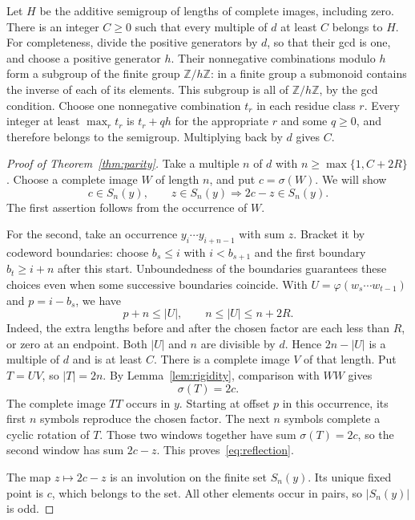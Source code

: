 \documentclass[11pt]{article}
\newcommand{\Z}{\mathbb Z}
\newcommand{\sumword}[1]{\sigma(#1)}
\begin{document}
Let $H$ be the additive semigroup of lengths of complete images, including
zero. There is an integer $C\geq0$ such that every multiple of $d$ at
least $C$ belongs to $H$. For completeness, divide the positive
generators by $d$, so that their gcd is one, and choose a positive
generator $h$. Their nonnegative combinations modulo $h$ form a subgroup
of the finite group $\Z/h\Z$: in a finite group a submonoid contains
the inverse of each of its elements. This subgroup is all of
$\Z/h\Z$, by the gcd condition. Choose one nonnegative combination
$t_r$ in each residue class $r$. Every integer at least $\max_r t_r$
is $t_r+qh$ for the appropriate $r$ and some $q\geq0$, and therefore
belongs to the semigroup. Multiplying back by $d$ gives $C$.

\begin{proof}[Proof of Theorem~\ref{thm:parity}]
Take a multiple $n$ of $d$ with $n\geq\max\{1,C+2R\}$.
Choose a complete image $W$ of length $n$, and put $c=\sumword{W}$.
We will show
\begin{equation}\label{eq:reflection}
 c\in S_n(y),\qquad z\in S_n(y)\Longrightarrow 2c-z\in S_n(y).
\end{equation}
The first assertion follows from the occurrence of $W$.

For the second, take an occurrence $y_i\cdots y_{i+n-1}$ with sum $z$.
Bracket it by codeword boundaries: choose $b_s\leq i$ with
$i<b_{s+1}$ and the first boundary $b_t\geq i+n$ after this start.
Unboundedness of the boundaries guarantees these choices even when some
successive boundaries coincide. With
$U=\varphi(w_s\cdots w_{t-1})$ and $p=i-b_s$, we have
\[
 p+n\leq |U|,\qquad n\leq |U|\leq n+2R.
\]
Indeed, the extra lengths before and after the chosen factor are each
less than $R$, or zero at an endpoint. Both $|U|$ and $n$ are divisible
by $d$. Hence $2n-|U|$ is a multiple of $d$ and is at least $C$.
There is a complete image $V$ of that length. Put $T=UV$, so $|T|=2n$.
By Lemma~\ref{lem:rigidity}, comparison with $WW$ gives
\[
 \sumword{T}=2c.
\]
The complete image $TT$ occurs in $y$. Starting at offset $p$ in this
occurrence, its first $n$ symbols reproduce the chosen factor. The next
$n$ symbols complete a cyclic rotation of $T$. Those two windows
together have sum $\sumword{T}=2c$, so the second window has sum $2c-z$.
This proves~\eqref{eq:reflection}.

The map $z\mapsto2c-z$ is an involution on the finite set $S_n(y)$.
Its unique fixed point is $c$, which belongs to the set. All other
elements occur in pairs, so $|S_n(y)|$ is odd.
\end{proof}
\end{document}

